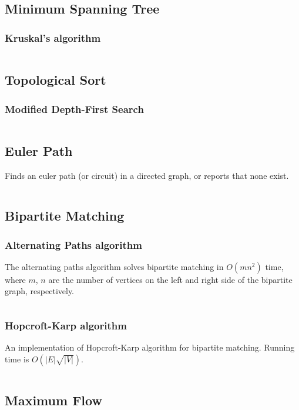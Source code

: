 \documentclass[9pt,a4paper,twocolumn,landscape,oneside]{amsart}
\newcommand{\code}[1]{\inputminted{cpp}{_code/#1}}
\begin{document}
    \subsection{Minimum Spanning Tree}
        \subsubsection{Kruskal's algorithm}
            \code{graph/kruskals_mst.cpp}

    \subsection{Topological Sort}
        \subsubsection{Modified Depth-First Search}
            \code{graph/tsort.cpp}

    \subsection{Euler Path}
        Finds an euler path (or circuit) in a directed graph, or reports that
        none exist.
        \code{graph/euler_path.cpp}

    \subsection{Bipartite Matching}

        \subsubsection{Alternating Paths algorithm}
            The alternating paths algorithm solves bipartite matching in $O(mn^2)$
            time, where $m$, $n$ are the number of vertices on the left and right
            side of the bipartite graph, respectively.
            \code{graph/bipartite_matching.cpp}

        \subsubsection{Hopcroft-Karp algorithm}
            An implementation of Hopcroft-Karp algorithm for bipartite
            matching. Running time is $O(|E|\sqrt{|V|})$.
            \code{graph/hopcroft_karp.cpp}

    \subsection{Maximum Flow}
\end{document}
